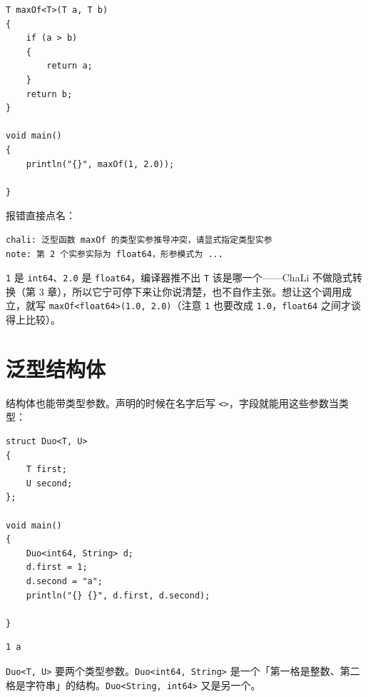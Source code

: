 \par
\medskip
\begin{lstlisting}[style=chali]
T maxOf<T>(T a, T b)
{
    if (a > b)
    {
        return a;
    }
    return b;
}

void main()
{
    println("{}", maxOf(1, 2.0));

}
\end{lstlisting}
\par
\medskip

报错直接点名：

\par
\medskip
\begin{lstlisting}[style=out]
chali: 泛型函数 maxOf 的类型实参推导冲突，请显式指定类型实参
note: 第 2 个实参实际为 float64，形参模式为 ...
\end{lstlisting}
\par
\medskip

\texttt{1} 是 \texttt{int64}、\texttt{2.\allowbreak{}0} 是 \texttt{float64}，编译器推不出 \texttt{T} 该是哪一个——ChaLi 不做隐式转换（第 3 章），所以它宁可停下来让你说清楚，也不自作主张。想让这个调用成立，就写 \texttt{max\allowbreak{}Of<\allowbreak{}float64>\allowbreak{}(\allowbreak{}1.\allowbreak{}0,\allowbreak{} 2.\allowbreak{}0)\allowbreak{}}（注意 \texttt{1} 也要改成 \texttt{1.\allowbreak{}0}，\texttt{float64} 之间才谈得上比较）。

\section{泛型结构体}

结构体也能带类型参数。声明的时候在名字后写 \texttt{<\allowbreak{}>\allowbreak{}}，字段就能用这些参数当类型：

\par
\medskip
\begin{lstlisting}[style=chali]
struct Duo<T, U>
{
    T first;
    U second;
};

void main()
{
    Duo<int64, String> d;
    d.first = 1;
    d.second = "a";
    println("{} {}", d.first, d.second);

}
\end{lstlisting}
\par
\medskip

\par
\medskip
\begin{lstlisting}[style=out]
1 a
\end{lstlisting}
\par
\medskip

\texttt{Duo<\allowbreak{}T,\allowbreak{} U>\allowbreak{}} 要两个类型参数。\texttt{Duo<\allowbreak{}int64,\allowbreak{} String>\allowbreak{}} 是一个「第一格是整数、第二格是字符串」的结构。\texttt{Duo<\allowbreak{}String,\allowbreak{} int64>\allowbreak{}} 又是另一个。

